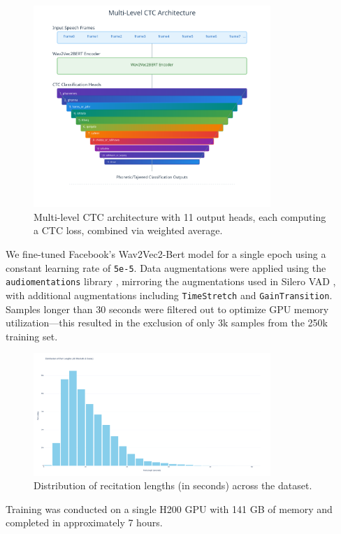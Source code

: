 \begin{figure}[H]
\centering
\includegraphics[width=0.8\textwidth]{../figures/multi-level-ctc.png}
\caption{Multi-level CTC architecture with 11 output heads, each computing a CTC loss, combined via weighted average.}
\label{fig:multi_level_ctc}
\end{figure}

We fine-tuned Facebook's Wav2Vec2-Bert model \cite{barrault2023seamless} for a single epoch using a constant learning rate of \texttt{5e-5}. Data augmentations were applied using the \texttt{audiomentations} library \cite{Audiomentations}, mirroring the augmentations used in Silero VAD \cite{SileroVAD}, with additional augmentations including \texttt{TimeStretch} and \texttt{GainTransition}. Samples longer than 30 seconds were filtered out to optimize GPU memory utilization—this resulted in the exclusion of only 3k samples from the 250k training set.

\begin{figure}[H]
\centering
\includegraphics[width=0.8\textwidth]{./figures/audio-lens.png}
\caption{Distribution of recitation lengths (in seconds) across the dataset.}
\label{fig:audio_lens}
\end{figure}

Training was conducted on a single H200 GPU with 141 GB of memory and completed in approximately 7 hours.
